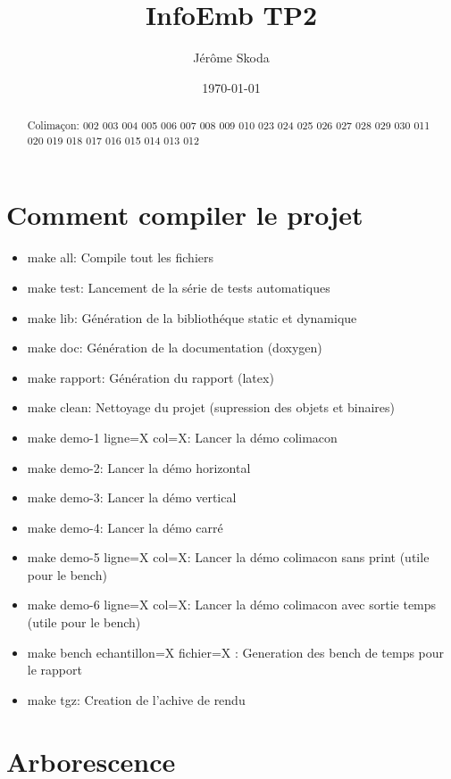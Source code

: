 \documentclass[a4paper]{article}
\title{InfoEmb TP2}
\author{Jérôme Skoda}
\date{\today}
\begin{document}
\maketitle

\begin{abstract}
 Colimaçon:   002  003  004  005  006  007  008  009  010   023  024  025  026  027  028  029  030  011   020  019  018  017  016  015  014  013  012 \newline
\end{abstract}

\section{Comment compiler le projet}

\begin{itemize}
\item make all: Compile tout les fichiers
\item make test: Lancement de la série de tests automatiques
\item make lib: Génération de la bibliothéque static et dynamique
\item make doc: Génération de la documentation (doxygen)
\item make rapport: Génération du rapport (latex)
\item make clean: Nettoyage du projet (supression des objets et binaires)
\item make demo-1 ligne=X col=X: Lancer la démo colimacon
\item make demo-2: Lancer la démo horizontal
\item make demo-3: Lancer la démo vertical
\item make demo-4: Lancer la démo carré
\item make demo-5 ligne=X col=X: Lancer la démo colimacon sans print (utile pour le bench)
\item make demo-6 ligne=X col=X: Lancer la démo colimacon avec sortie temps (utile pour le bench)
\item make bench echantillon=X fichier=X : Generation des bench de temps pour le rapport
\item make tgz: Creation de l'achive de rendu
\end{itemize}

\section{Arborescence}
\end{document}
